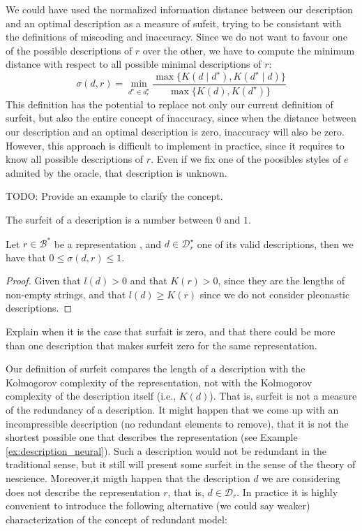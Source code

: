 \begin{remark}
We could have used the normalized information distance between our description and an optimal description as a measure of sufeit, trying to be consistant with the definitions of miscoding and inaccuracy. Since we do not want to favour one of the possible descriptions of $r$ over the other, we have to compute the minimum distance with respect to all possible minimal descriptions of $r$:
\[
\sigma (d, r) = { \underset{ d^\star \in d^\star_r } \min} \frac{ \max\{ K \left( d \mid d^\star \right), K \left( d^\star \mid d \right) \} } { \max\{ K \left( d \right), K \left( d^\star \right) \} }
\]
This definition has the potential to replace not only our current definition of surfeit, but also the entire concept of inaccuracy, since when the distance between our description and an optimal description is zero, inaccuracy will also be zero. However, this approach is difficult to implement in practice, since it requires to know all possible descriptions of $r$. Even if we fix one of the poosibles styles of $e$ admited by the oracle, that description is unknown.
\end{remark}

\begin{example}
{\color{red} TODO: Provide an example to clarify the concept.}
\end{example}

The surfeit of a description is a number between $0$ and $1$.

\begin{proposition}
\label{prop:range_redundancy}
Let $r \in \mathcal{B}^\ast$ be a representation , and $d \in \mathcal{D}^\star_r$ one of its valid descriptions, then we have that $0 \leq \sigma(d, r) \leq 1$.
\end{proposition}
\begin{proof}
Given that $l\left( d \right)>0$ and that $K\left( r \right)>0$, since they are the lengths of non-empty strings, and that $l\left( d \right) \geq K\left( r \right)$ since we do not consider pleonastic descriptions.
\end{proof}

{\color{red} Explain when it is the case that surfait is zero, and that there could be more than one description that makes surfeit zero for the same representation.}

Our definition of surfeit compares the length of a description with the Kolmogorov complexity of the representation, not with the Kolmogorov complexity of the description itself (i.e., $K\left( d \right)$). That is, surfeit is not a measure of the redundancy of a description. It might happen that we come up with an incompressible description (no redundant elements to remove), that it is not the shortest possible one that describes the representation (see Example \ref{ex:description_neural}). Such a description would not be redundant in the traditional sense, but it still will present some surfeit in the sense of the theory of nescience. Moreover,it migth happen that the description $d$ we are considering does not describe the representation $r$, that is, $d \in \mathcal{D}_r$. In practice it is highly convenient to introduce the following alternative (we could say weaker) characterization of the concept of redundant model:

